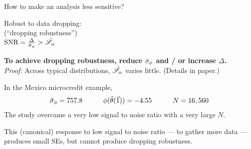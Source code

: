 \begin{frame}[t]{How to make an analysis less sensitive?}

\begin{center}
    Robust to data dropping:\\
    (``dropping robustness'')\\
    \vspace{1em}
    $\textrm{SNR} = \frac{\Delta}{\hat\sigma_{\phi}} > \hat{\mathscr{S}}_\alpha$
\end{center}

\vspace{1em}
\hrulefill

\vspace{1em}
\textbf{To achieve dropping robustness,
reduce $\hat\sigma_{\phi}$ and / or increase $\Delta$.\\}
\textit{Proof: }
Across typical distributions, $\hat{\mathscr{S}}_\alpha$ varies little.
(Details in paper.)


\vspace{1em}
In the Mexico microcredit example,
%
\begin{align*}
%
\noise = \MxNoise
\quad\quad\quad
\thetafun(\thetahat(\onevec)) = \MxBetahat
\quad\quad\quad
N = \MxNobs
%
\end{align*}
%
The study overcame a very low signal to noise ratio with a very large $N$.

\vspace{1em} This (canonical) response to low signal to noise ratio --- to
gather more data --- produces small SEs, but cannot produce dropping
robustness.

\end{frame}
